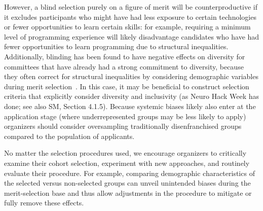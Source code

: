 However, a blind selection purely on a figure of merit will be counterproductive if it excludes participants who might have had less exposure to certain technologies or fewer opportunities to learn certain skills: for example, requiring a minimum level of programming experience will likely disadvantage candidates who have had fewer opportunities to learn programming due to structural inequalities. 
Additionally, blinding has been found to have negative effects on diversity for committees that have already had a strong commitment to diversity, because they often correct for structural inequalities by considering demographic variables during merit selection~\cite{behaghel2015unintended}.
In this case, it may be beneficial to construct selection criteria that explicitly consider diversity and inclusivity (as Neuro Hack Week has done; see also SM, Section 4.1.5). 
Because systemic biases likely also enter at the application stage (where underrepresented groups may be less likely to apply) organizers should consider oversampling traditionally disenfranchised groups compared to the population of applicants. 

No matter the selection procedures used, we encourage organizers to critically examine their cohort selection, experiment with new approaches, and routinely evaluate their procedure. For example, comparing demographic characteristics of the selected versus non-selected groups can unveil unintended biases during the merit-selection base and thus allow adjustments in the procedure to mitigate or fully remove these effects.

